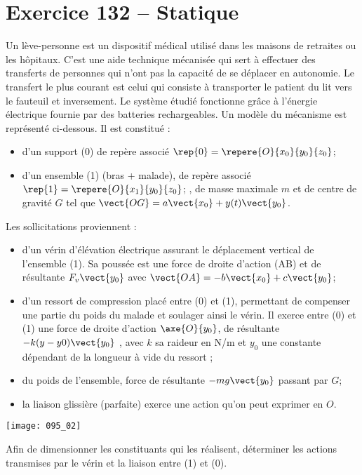 \section*{Exercice 132 -- Statique}
\setcounter{exo}{0}

Un lève-personne est un dispositif médical utilisé dans les maisons
de retraites ou les hôpitaux. C’est une aide technique mécanisée qui
sert à effectuer des transferts de personnes qui n’ont pas la
capacité de se déplacer en autonomie.
Le transfert le plus courant est celui qui consiste à transporter le
patient du lit vers le fauteuil et inversement.
Le système étudié fonctionne grâce à l’énergie électrique fournie
par des batteries rechargeables.
Un modèle du mécanisme est représenté ci-dessous. Il est
constitué :
\begin{itemize}
\item d’un support (0) de repère associé $\rep{0}= \repere{O}{x_0}{y_0}{z_0}$;
\item d’un ensemble (1) (bras + malade), de repère associé $\rep{1}= \repere{O}{x_1}{y_0}{z_0}$; , de masse maximale $m$ et de centre de gravité $G$ tel que $\vect{OG} = a \vect{x_0} + y(t) \vect{y_0}$.
\end{itemize}

Les sollicitations proviennent :
\begin{itemize}
\item d’un vérin d’élévation électrique assurant le déplacement vertical
de l’ensemble (1). Sa poussée est une force de droite d’action (AB)
et de résultante $F_v \vect{y_0}$ avec $\vect{OA} = -b \vect{x_0} + c\vect{y_0}$;
\item d’un ressort de compression placé entre (0) et (1), permettant de compenser une partie du poids du malade et soulager ainsi le vérin.
Il exerce entre (0) et (1) une force de droite d’action $\axe{O}{y_0}$, de
résultante $-k(y - y0) \vect{y_0}$ , avec $k$ sa raideur en N/m et $y_0$ une
constante dépendant de la longueur à vide du ressort ;
\item du poids de l’ensemble, force de résultante $-mg \vect{y_0}$ passant par $G$;
\item la liaison glissière (parfaite) exerce une action qu'on peut exprimer en $O$.
\end{itemize}


\begin{center}
\texttt{[image: 095\_02]}
\end{center}


\begin{obj}
Afin de dimensionner les constituants qui les réalisent, déterminer les actions transmises par le
vérin et la liaison entre (1) et (0).
\end{obj}

